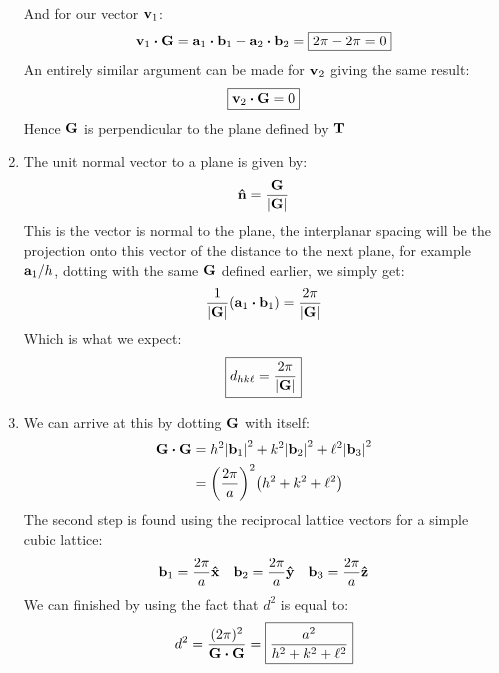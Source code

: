 \documentclass[12pt]{article}
\begin{document}
\begin{enumerate}[label=\alph*)]
  And for our vector $\vb{v}_1$:
  \begin{align*}
    \vb{v}_1\vdot\vb{G}=\vb{a}_1\vdot\vb{b}_1-\vb{a}_2\vdot\vb{b}_2
    =\boxed{2\pi-2\pi=0}
  \end{align*}
  An entirely similar argument can be made for $\vb{v}_2$ giving the same result:
  \begin{align*}
    \boxed{\vb{v}_2\vdot\vb{G}=0}
  \end{align*}
  Hence $\vb{G}$ is perpendicular to the plane defined by $\vb{T}$
\item The unit normal vector to a plane is given by:
  \begin{align*}
    \vu{n}=\frac{\vb{G}}{\abs{\vb{G}}}
  \end{align*}
  This is the vector is normal to the plane, the interplanar spacing will be the projection onto this vector of the distance to the next plane, for example $\vb{a}_1/h$, dotting with the same $\vb{G}$ defined earlier, we simply get:
  \begin{align*}
    \frac{1}{\abs{\vb{G}}}\qty(\vb{a}_1\vdot\vb{b}_1)=\frac{2\pi}{\abs{\vb{G}}}
  \end{align*}
  Which is what we expect:
  \begin{align*}
    \boxed{d_{hk\ell}=\frac{2\pi}{\abs{\vb{G}}}}
  \end{align*}
\item We can arrive at this by dotting $\vb{G}$ with itself:
  \begin{align*}
    \vb{G}\vdot\vb{G}&=
    h^2\abs{\vb{b}_1}^2
    +k^2\abs{\vb{b}_2}^2
    +\ell^2\abs{\vb{b}_3}^2\\
    &=\qty(\frac{2\pi}{a})^2\qty(h^2+k^2+\ell^2)
  \end{align*}
  The second step is found using the reciprocal lattice vectors for a simple cubic lattice:
  \begin{align*}
    \vb{b}_1=\frac{2\pi}{a}\vu{x}\quad
    \vb{b}_2=\frac{2\pi}{a}\vu{y}\quad
    \vb{b}_3=\frac{2\pi}{a}\vu{z}
  \end{align*}
  We can finished by using the fact that $d^2$ is equal to:
  \begin{align*}
    d^2=\frac{(2\pi)^2}{\vb{G}\vdot\vb{G}}=\boxed{\frac{a^2}{h^2+k^2+\ell^2}}
  \end{align*}
\end{enumerate}
\end{document}
